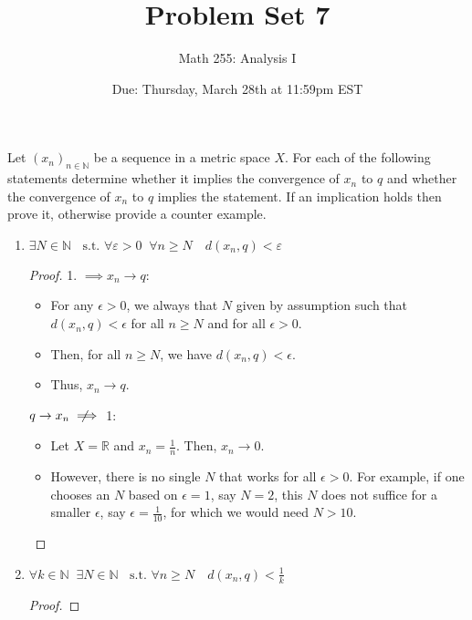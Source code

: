 \documentclass[10pt]{article}
\newcommand{\N}{\mathbb{N}}
\newcommand{\R}{\mathbb{R}}
\newcommand{\notimplies}{%
  \mathrel{{\ooalign{\hidewidth$\not\phantom{=}$\hidewidth\cr$\implies$}}}}
\newenvironment{problem}[2][Problem]{\begin{trivlist}
\item[\hskip \labelsep {\bfseries #1}\hskip \labelsep {\bfseries #2.}]}{\end{trivlist}}
\begin{document}
\title{Problem Set 7}
\author{Math 255: Analysis I}
\date{Due: Thursday, March 28th at 11:59pm EST}

\maketitle

\begin{problem}{1} 
	Let $ (x_n)_{n\in \N} $ be a sequence in a metric space $ X $. For each of the following statements determine whether it implies the convergence of $ x_n $ to $q $ and whether the convergence of $ x_n $ to $ q $ implies the statement. If an implication holds then prove it, otherwise provide a counter example.
	\begin{enumerate}
		\item $ \exists N\in \N \;\;\text{ s.t. } \forall \varepsilon >0 \;\; \forall n \geq N \quad d(x_n,q)<\varepsilon  $
            \begin{proof} \hfill

                1. $\implies x_n \to q $:
                \begin{itemize}
                    \item For any $\epsilon > 0$, we always that $N$ given by assumption such that $d(x_n, q) < \epsilon$ for all $n \geq N$ and for all $\epsilon > 0$.
                    \item Then, for all $n \geq N$, we have $d(x_n, q) < \epsilon$.
                    \item Thus, $x_n \to q$.
                \end{itemize}
                $q \to x_n \notimplies$ 1: \hfill
                \begin{itemize}
                    \item Let $X = \R$ and $x_n = \frac{1}{n}$. Then, $x_n \to 0$.
                    \item However, there is no single $N$ that works for all $\epsilon > 0$. For example, if one chooses an $N$ based on $\epsilon = 1$, say $N = 2$, this $N$ does not suffice for a smaller $\epsilon$, say $\epsilon = \frac{1}{10}$, for which we would need $N > 10$.
                \end{itemize}
            \end{proof}
		\item $ \forall k \in \N \;\; \exists N\in \N \;\;\text{ s.t. } \forall n \geq N \quad d(x_n,q)<\frac{1}{k} $
            \begin{proof} \hfill
                

\end{proof}
\end{enumerate}
\end{problem}
\end{document}
